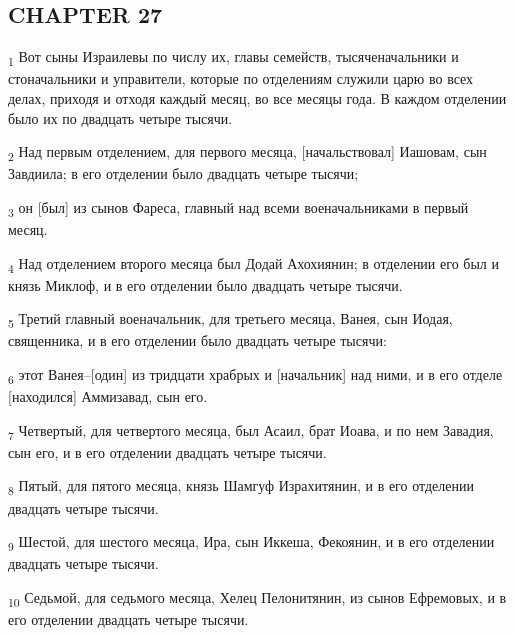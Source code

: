 \subsection{CHAPTER 27}
\begin{tcolorbox}
\textsubscript{1} Вот сыны Израилевы по числу их, главы семейств, тысяченачальники и стоначальники и управители, которые по отделениям служили царю во всех делах, приходя и отходя каждый месяц, во все месяцы года. В каждом отделении было их по двадцать четыре тысячи.
\end{tcolorbox}
\begin{tcolorbox}
\textsubscript{2} Над первым отделением, для первого месяца, [начальствовал] Иашовам, сын Завдиила; в его отделении было двадцать четыре тысячи;
\end{tcolorbox}
\begin{tcolorbox}
\textsubscript{3} он [был] из сынов Фареса, главный над всеми военачальниками в первый месяц.
\end{tcolorbox}
\begin{tcolorbox}
\textsubscript{4} Над отделением второго месяца был Додай Ахохиянин; в отделении его был и князь Миклоф, и в его отделении было двадцать четыре тысячи.
\end{tcolorbox}
\begin{tcolorbox}
\textsubscript{5} Третий главный военачальник, для третьего месяца, Ванея, сын Иодая, священника, и в его отделении было двадцать четыре тысячи:
\end{tcolorbox}
\begin{tcolorbox}
\textsubscript{6} этот Ванея--[один] из тридцати храбрых и [начальник] над ними, и в его отделе [находился] Аммизавад, сын его.
\end{tcolorbox}
\begin{tcolorbox}
\textsubscript{7} Четвертый, для четвертого месяца, был Асаил, брат Иоава, и по нем Завадия, сын его, и в его отделении двадцать четыре тысячи.
\end{tcolorbox}
\begin{tcolorbox}
\textsubscript{8} Пятый, для пятого месяца, князь Шамгуф Израхитянин, и в его отделении двадцать четыре тысячи.
\end{tcolorbox}
\begin{tcolorbox}
\textsubscript{9} Шестой, для шестого месяца, Ира, сын Иккеша, Фекоянин, и в его отделении двадцать четыре тысячи.
\end{tcolorbox}
\begin{tcolorbox}
\textsubscript{10} Седьмой, для седьмого месяца, Хелец Пелонитянин, из сынов Ефремовых, и в его отделении двадцать четыре тысячи.
\end{tcolorbox}
